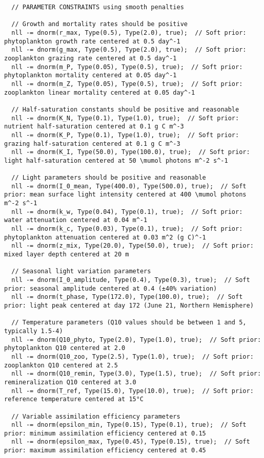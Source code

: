 \begin{lstlisting}
  // PARAMETER CONSTRAINTS using smooth penalties
  
  // Growth and mortality rates should be positive
  nll -= dnorm(r_max, Type(0.5), Type(2.0), true);  // Soft prior: phytoplankton growth rate centered at 0.5 day^-1
  nll -= dnorm(g_max, Type(0.5), Type(2.0), true);  // Soft prior: zooplankton grazing rate centered at 0.5 day^-1
  nll -= dnorm(m_P, Type(0.05), Type(0.5), true);  // Soft prior: phytoplankton mortality centered at 0.05 day^-1
  nll -= dnorm(m_Z, Type(0.05), Type(0.5), true);  // Soft prior: zooplankton linear mortality centered at 0.05 day^-1
  
  // Half-saturation constants should be positive and reasonable
  nll -= dnorm(K_N, Type(0.1), Type(1.0), true);  // Soft prior: nutrient half-saturation centered at 0.1 g C m^-3
  nll -= dnorm(K_P, Type(0.1), Type(1.0), true);  // Soft prior: grazing half-saturation centered at 0.1 g C m^-3
  nll -= dnorm(K_I, Type(50.0), Type(100.0), true);  // Soft prior: light half-saturation centered at 50 \mumol photons m^-2 s^-1
  
  // Light parameters should be positive and reasonable
  nll -= dnorm(I_0_mean, Type(400.0), Type(500.0), true);  // Soft prior: mean surface light intensity centered at 400 \mumol photons m^-2 s^-1
  nll -= dnorm(k_w, Type(0.04), Type(0.1), true);  // Soft prior: water attenuation centered at 0.04 m^-1
  nll -= dnorm(k_c, Type(0.03), Type(0.1), true);  // Soft prior: phytoplankton attenuation centered at 0.03 m^2 (g C)^-1
  nll -= dnorm(z_mix, Type(20.0), Type(50.0), true);  // Soft prior: mixed layer depth centered at 20 m
  
  // Seasonal light variation parameters
  nll -= dnorm(I_0_amplitude, Type(0.4), Type(0.3), true);  // Soft prior: seasonal amplitude centered at 0.4 (±40% variation)
  nll -= dnorm(t_phase, Type(172.0), Type(100.0), true);  // Soft prior: light peak centered at day 172 (June 21, Northern Hemisphere)
  
  // Temperature parameters (Q10 values should be between 1 and 5, typically 1.5-4)
  nll -= dnorm(Q10_phyto, Type(2.0), Type(1.0), true);  // Soft prior: phytoplankton Q10 centered at 2.0
  nll -= dnorm(Q10_zoo, Type(2.5), Type(1.0), true);  // Soft prior: zooplankton Q10 centered at 2.5
  nll -= dnorm(Q10_remin, Type(3.0), Type(1.5), true);  // Soft prior: remineralization Q10 centered at 3.0
  nll -= dnorm(T_ref, Type(15.0), Type(10.0), true);  // Soft prior: reference temperature centered at 15°C
  
  // Variable assimilation efficiency parameters
  nll -= dnorm(epsilon_min, Type(0.15), Type(0.1), true);  // Soft prior: minimum assimilation efficiency centered at 0.15
  nll -= dnorm(epsilon_max, Type(0.45), Type(0.15), true);  // Soft prior: maximum assimilation efficiency centered at 0.45
  

\end{lstlisting}
